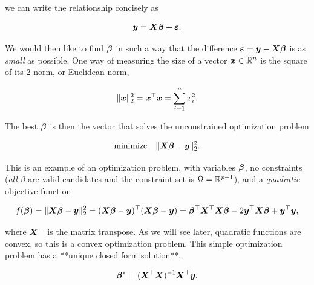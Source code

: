 \begin{example}
we can write the relationship concisely as 

\begin{equation*}
 \bm{y} = \bm{X}\bm{\beta}+\bm{\varepsilon}.
\end{equation*}

We would then like to find $\bm{\beta}$ in such a way that the difference $\bm{\varepsilon}=\bm{y}-\bm{X}\bm{\beta}$ is as {\em small} as possible. One way of measuring the size of a vector $\bm{x}\in \mathbb{R}^n$ is the square of its $2$-norm, or Euclidean norm, 

\begin{equation*}
 \Vert {\bm{x}}\Vert_2^2=\bm{x}^{\top}\bm{x}=\sum_{i=1}^nx_i^2.
\end{equation*}

The best $\bm{\beta}$ is then the vector that solves the unconstrained optimization problem

\begin{equation*}
 \text{minimize}\quad \Vert {\bm{X}\bm{\beta}-\bm{y}}\Vert_2^2.
\end{equation*}

This is an example of an optimization problem, with variables $\bm{\beta}$, no constraints ({\em all} $\beta$ are valid candidates and the constraint set is $\Omega=\mathbb{R}^{p+1}$), and a {\em quadratic} objective function 

\begin{equation*}
f(\bm{\beta})=\Vert {\bm{X}\bm{\beta}-\bm{y}}\Vert_2^2 = (\bm{X}\bm{\beta}-\bm{y})^{\top}(\bm{X}\bm{\beta}-\bm{y}) = \bm{\beta}^{\top}\bm{X}^{\top}\bm{X}\bm{\beta}-2\bm{y}^{\top}\bm{X}\bm{\beta}+\bm{y}^{\top}\bm{y},
\end{equation*}

where $\bm{X}^{\top}$ is the matrix transpose.
As we will see later, quadratic functions are convex, so this is a convex optimization problem.
This simple optimization problem has a **unique closed form solution**,

\begin{equation}\label{eq:least1}
 \bm{\beta}^* = (\bm{X}^{\top}\bm{X})^{-1}\bm{X}^{\top}\bm{y}.
\end{equation}


\end{example}
